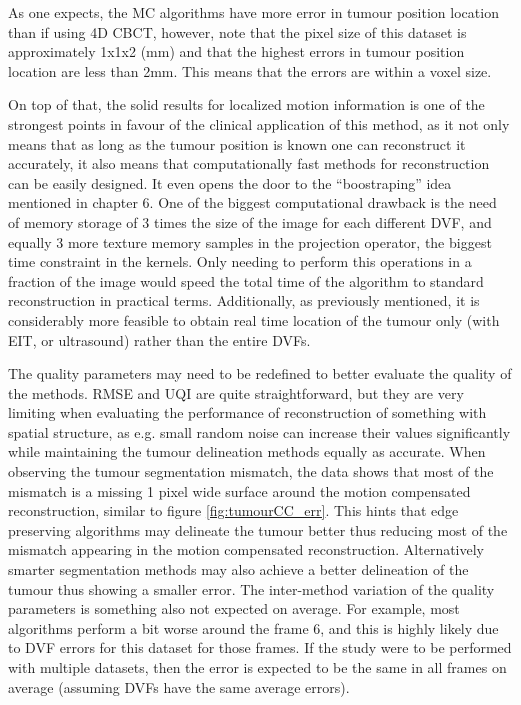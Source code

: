As one expects, the MC algorithms have more error in tumour position location than if using 4D CBCT, however, note that the pixel size of this dataset is approximately 1x1x2 (mm) and that the highest errors in tumour position location are less than 2mm. This means that the errors are within a voxel size.
 
On top of that, the solid results for localized motion information is one of the strongest points in favour of the clinical application of this method, as it not only means that as long as the tumour position is known one can reconstruct it accurately, it also means that computationally fast methods for reconstruction can be easily designed. It even opens the door to the ``boostraping'' idea mentioned in chapter 6. One of the biggest computational drawback is the need of memory storage of 3 times the size of the image for each different DVF, and equally 3 more texture memory samples in the projection operator, the biggest time constraint in the kernels. Only needing to perform this operations in a fraction of the image would speed the total time of the algorithm to standard reconstruction in practical terms. Additionally, as previously mentioned, it is considerably more feasible to obtain real time location of the tumour only (with EIT, or ultrasound) rather than the entire DVFs. 

The quality parameters may need to be redefined to better evaluate the quality of the methods. RMSE and UQI are quite straightforward, but they are very limiting when evaluating the performance of reconstruction of something with spatial structure, as e.g. small random noise can increase their values significantly while maintaining the tumour delineation methods equally as accurate. When observing the tumour segmentation mismatch, the data shows that most of the mismatch is a missing 1 pixel wide surface around the motion compensated reconstruction, similar to figure \ref{fig:tumourCC_err}. This hints that edge preserving algorithms may delineate the tumour better thus reducing most of the mismatch appearing in the motion compensated reconstruction. Alternatively smarter segmentation methods may also achieve a better delineation of the tumour thus showing a smaller error. The inter-method variation of the quality parameters is something also not expected on average. For example, most algorithms perform a bit worse around the frame 6, and this is highly likely due to DVF errors for this dataset for those frames. If the study were to be performed with multiple datasets, then the error is expected to be the same in all frames on average (assuming DVFs have the same average errors). 


